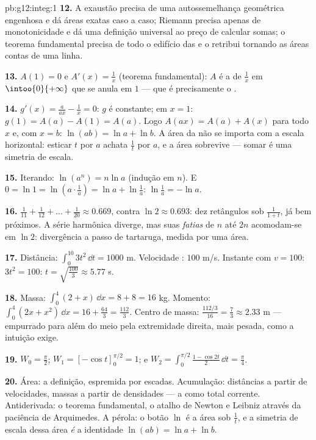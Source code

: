 \begin{solution}{pb:g12:integ:1}
\textbf{12.} A exaustão precisa de uma autossemelhança
geométrica engenhosa e dá áreas exatas caso a caso; Riemann
precisa apenas de monotonicidade e dá uma definição universal
ao preço de calcular somas; o teorema fundamental precisa de
todo o edifício das  e o retribui tornando as áreas
contas de uma linha.

\textbf{13.} $A(1) = 0$ e $A'(x) = \frac1x$ (teorema
fundamental): $A$ é a  de $\frac1x$ em
$\intoo{0}{+\infty}$ que se anula em $1$ --- que é
precisamente o .

\textbf{14.} $g'(x) = \frac{a}{ax} - \frac1x = 0$: $g$ é
constante; em $x = 1$: $g(1) = A(a) - A(1) = A(a)$. Logo
$A(ax) = A(a) + A(x)$ para todo $x$ e, com $x = b$:
$\ln(ab) = \ln a + \ln b$. A área da  não se importa
com a escala horizontal: esticar $t$ por $a$ achata $\frac1t$
por $a$, e a área sobrevive --- somar  é uma simetria
de escala.

\textbf{15.} Iterando: $\ln(a^n) = n\ln a$ (indução em $n$). E
$0 = \ln 1 = \ln\left(a \cdot \frac1a\right) =
\ln a + \ln\frac1a$: $\ln\frac1a = -\ln a$.

\textbf{16.} $\frac{1}{11} + \frac{1}{12} + \dots +
\frac{1}{20} \approx 0.669$, contra $\ln 2 \approx 0.693$: dez
retângulos sob $\frac{1}{1+t}$, já bem próximos. A série
harmônica diverge, mas suas \emph{fatias} de $n$ até $2n$
acomodam-se em $\ln 2$: divergência a passo de tartaruga,
medida por uma área.

\textbf{17.} Distância: $\int_0^{10} 3t^2\,\dd t = 1000$ m.
Velocidade : $100$ m/s. Instante com $v = 100$:
$3t^2 = 100$: $t = \sqrt{\frac{100}{3}} \approx 5.77$ s.

\textbf{18.} Massa: $\int_0^4 (2 + x)\,\dd x = 8 + 8 = 16$ kg.
Momento: $\int_0^4 (2x + x^2)\,\dd x = 16 + \frac{64}{3} =
\frac{112}{3}$. Centro de massa:
$\frac{112/3}{16} = \frac73 \approx 2.33$ m --- empurrado para
além do meio pela extremidade direita, mais pesada, como a
intuição exige.

\textbf{19.} $W_0 = \frac\pi2$;
$W_1 = \left[-\cos t\right]_0^{\pi/2} = 1$; e
$W_2 = \int_0^{\pi/2} \frac{1 - \cos 2t}{2}\,\dd t =
\frac\pi4$.

\textbf{20.} Área: a definição, espremida por escadas.
Acumulação: distâncias a partir de velocidades, massas a partir
de densidades --- a  como total corrente. Antiderivada:
o teorema fundamental, o atalho de Newton e Leibniz através da
paciência de Arquimedes. A pérola: o botão $\ln$ é a área sob
$\frac1t$, e a simetria de escala dessa área \emph{é} a
identidade $\ln(ab) = \ln a + \ln b$.
\end{solution}
